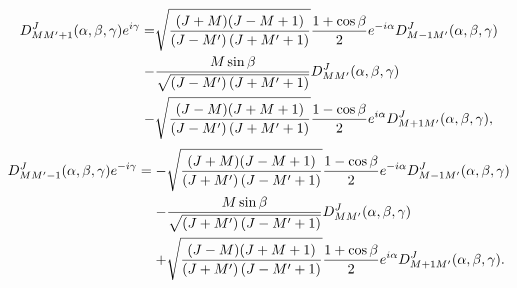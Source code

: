 \begin{align}
\end{align}\begin{align}
D_{M M^{\prime}+1}^{J}(\alpha, \beta, \gamma) e^{i \gamma}= & \sqrt{\frac{(J+M)(J-M+1)}{\left(J-M^{\prime}\right)\left(J+M^{\prime}+1\right)}} \frac{1+\cos \beta}{2} e^{-i \alpha} D_{M-1 M^{\prime}}^{J}(\alpha, \beta, \gamma) \notag\\
- & \frac{M \sin \beta}{\sqrt{\left(J-M^{\prime}\right)\left(J+M^{\prime}+1\right)}} D_{M M^{\prime}}^{J}(\alpha, \beta, \gamma) \notag\\
- & \sqrt{\frac{(J-M)(J+M+1)}{\left(J-M^{\prime}\right)\left(J+M^{\prime}+1\right)}} \frac{1-\cos \beta}{2} e^{i \alpha} D_{M+1 M^{\prime}}^{J}(\alpha, \beta, \gamma) , \label{eq:4:8:20}
\end{align}\begin{align}
D_{M M^{\prime}-1}^{J}(\alpha, \beta, \gamma) e^{-i \gamma}=- & \sqrt{\frac{(J+M)(J-M+1)}{\left(J+M^{\prime}\right)\left(J-M^{\prime}+1\right)}} \frac{1-\cos \beta}{2} e^{-i \alpha} D_{M-1 M^{\prime}}^{J}(\alpha, \beta, \gamma) \notag\\
- & \frac{M \sin \beta}{\sqrt{\left(J+M^{\prime}\right)\left(J-M^{\prime}+1\right)}} D_{M M^{\prime}}^{J}(\alpha, \beta, \gamma) \notag\\
+ & \sqrt{\frac{(J-M)(J+M+1)}{\left(J+M^{\prime}\right)\left(J-M^{\prime}+1\right)}} \frac{1+\cos \beta}{2} e^{i \alpha} D_{M+1 M^{\prime}}^{J}(\alpha, \beta, \gamma). \label{eq:4:8:21}
\end{align}
